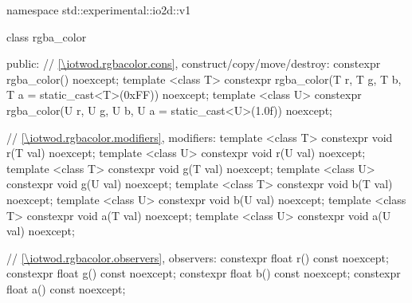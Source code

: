 \begin{codeblock}
namespace std::experimental::io2d::v1 {
  class rgba_color {
  public:
    // \ref{\iotwod.rgbacolor.cons}, construct/copy/move/destroy:
    constexpr rgba_color() noexcept;
    template <class T>
    constexpr rgba_color(T r, T g, T b, T a = static_cast<T>(0xFF)) noexcept;
    template <class U>
    constexpr rgba_color(U r, U g, U b, U a = static_cast<U>(1.0f)) noexcept;
  
    // \ref{\iotwod.rgbacolor.modifiers}, modifiers:
    template <class T>
    constexpr void r(T val) noexcept;
    template <class U>
    constexpr void r(U val) noexcept;
    template <class T>
    constexpr void g(T val) noexcept;
    template <class U>
    constexpr void g(U val) noexcept;
    template <class T>
    constexpr void b(T val) noexcept;
    template <class U>
    constexpr void b(U val) noexcept;
    template <class T>
    constexpr void a(T val) noexcept;
    template <class U>
    constexpr void a(U val) noexcept;
    
    // \ref{\iotwod.rgbacolor.observers}, observers:
    constexpr float r() const noexcept;
    constexpr float g() const noexcept;
    constexpr float b() const noexcept;
    constexpr float a() const noexcept;
    
}}
\end{codeblock}
